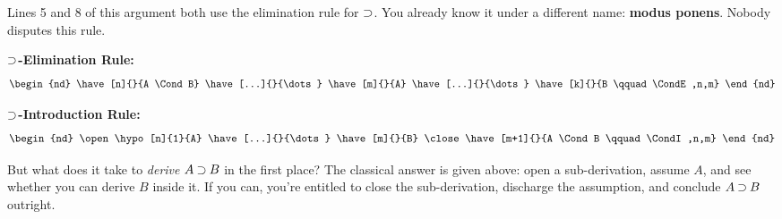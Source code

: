 \documentclass[options]{philosophersimprint}
\begin{document}
Lines 5 and 8 of this argument both use the elimination rule for $\mathbin{\supset}$. You already know it under a different name: \textbf{modus ponens}. Nobody disputes this rule.

\begin{center}
\begin{minipage}[t]{0.20\textwidth}
\textbf{$\mathbin{\supset}$-Elimination Rule:}
\vspace{-0.25cm}
\begin{align*}
 \begin{nd}
        \have[n]{}{A \Cond B}
        \have[...]{}{\dots}
        \have[m]{}{A}
        \have[...]{}{\dots}
        \have[k]{}{B    \qquad\CondE,n,m}
    \end{nd}
\end{align*}
\end{minipage}
\hfill
\begin{minipage}[t]{0.20\textwidth}
\textbf{$\mathbin{\supset}$-Introduction Rule:}
\vspace{-0.25cm}
\begin{align*}
\begin{nd}
\open
\hypo[n]{1}{A}
\have[...]{}{\dots}
\have[m]{}{B}
\close
\have[m+1]{}{A \Cond B    \qquad\CondI,n,m}
\end{nd}
\end{align*}
\end{minipage}
\end{center}
But what does it take to \textit{derive} $A \mathbin{\supset} B$ in the first place? The classical answer is given above: open a sub-derivation, assume $A$, and see whether you can derive $B$ inside it. If you can, you're entitled to close the sub-derivation, discharge the assumption, and conclude $A \mathbin{\supset} B$ outright.
\end{document}
